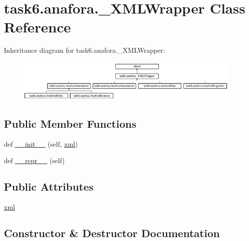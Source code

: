 \hypertarget{classtask6_1_1anafora_1_1__XMLWrapper}{}\section{task6.\+anafora.\+\_\+\+X\+M\+L\+Wrapper Class Reference}
\label{classtask6_1_1anafora_1_1__XMLWrapper}
Inheritance diagram for task6.\+anafora.\+\_\+\+X\+M\+L\+Wrapper\+:\begin{figure}[H]
\begin{center}
\leavevmode
\includegraphics[height=2.103286cm]{classtask6_1_1anafora_1_1__XMLWrapper}
\end{center}
\end{figure}
\subsection*{Public Member Functions}
\begin{DoxyCompactItemize}
\item 
def \hyperlink{classtask6_1_1anafora_1_1__XMLWrapper_aea0e752703d2794650b50201f1dc7f54}{\+\_\+\+\_\+init\+\_\+\+\_\+} (self, \hyperlink{classtask6_1_1anafora_1_1__XMLWrapper_abed00085815402c05f9569d349f8dfda}{xml})
\item 
def \hyperlink{classtask6_1_1anafora_1_1__XMLWrapper_a25cd940e4f6a8574dec4d0fc3e5ab4ce}{\+\_\+\+\_\+repr\+\_\+\+\_\+} (self)
\end{DoxyCompactItemize}
\subsection*{Public Attributes}
\begin{DoxyCompactItemize}
\item 
\hyperlink{classtask6_1_1anafora_1_1__XMLWrapper_abed00085815402c05f9569d349f8dfda}{xml}
\end{DoxyCompactItemize}


\subsection{Constructor \& Destructor Documentation}
\mbox{\label{classtask6_1_1anafora_1_1__XMLWrapper_aea0e752703d2794650b50201f1dc7f54}} 
